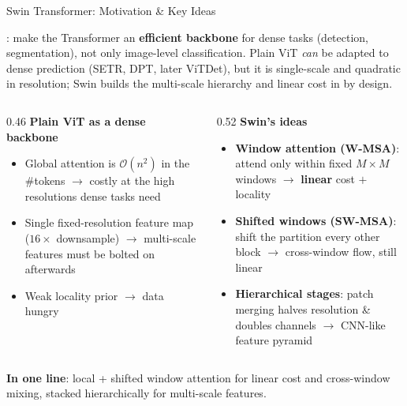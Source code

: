 \begin{frame}{Swin Transformer: Motivation \& Key Ideas}

  \cite{liu2021swin}: make the Transformer an \textbf{efficient backbone} for dense tasks (detection, segmentation), not only image-level classification. Plain ViT \emph{can} be adapted to dense prediction (SETR, DPT, later ViTDet), but it is single-scale and quadratic in resolution; Swin builds the multi-scale hierarchy and linear cost in by design.

  \vspace{0.4em}
  \begin{columns}[T]
    \begin{column}{0.46\textwidth}
      \textbf{Plain ViT as a dense backbone}
      \begin{itemize}\itemsep3pt
        \item Global attention is $\mathcal{O}(n^2)$ in the \#tokens $\to$ costly at the high resolutions dense tasks need
        \item Single fixed-resolution feature map ($16{\times}$ downsample) $\to$ multi-scale features must be bolted on afterwards
        \item Weak locality prior $\to$ data hungry
      \end{itemize}
    \end{column}
    \begin{column}{0.52\textwidth}
      \textbf{Swin's ideas}
      \begin{itemize}\itemsep3pt
        \item \textbf{Window attention (W-MSA)}: attend only within fixed $M{\times}M$ windows $\to$ \textbf{linear} cost $+$ locality
        \item \textbf{Shifted windows (SW-MSA)}: shift the partition every other block $\to$ cross-window flow, still linear
        \item \textbf{Hierarchical stages}: patch merging halves resolution \& doubles channels $\to$ CNN-like feature pyramid
      \end{itemize}
    \end{column}
  \end{columns}

  \vspace{0.4em}
  \textbf{In one line}: local + shifted window attention for linear cost and cross-window mixing, stacked hierarchically for multi-scale features.
\end{frame}

